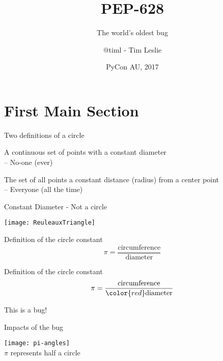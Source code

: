 \documentclass[14pt]{beamer}
\title{PEP-628}
\subtitle{The world's oldest bug}
\author{@timl - Tim Leslie\inst{1}}
\institute[Breakaway Consulting] %
{
  \inst{1}%
  Breakaway Consulting}
\date{PyCon AU, 2017}
\begin{document}
\begin{frame}
  \titlepage
\end{frame}

\section{First Main Section}

\begin{frame}{Two definitions of a circle}
    \begin{definition}
    A continuous set of points with a constant {\color{red}diameter}\\
    -- No-one (ever)
    \end{definition}
    \begin{definition}
    The set of all points a constant distance ({\color{red}radius}) from a center point\\
    -- Everyone (all the time)
    \end{definition}
\end{frame}

\begin{frame}{Constant Diameter - Not a circle}
\begin{center}
    \texttt{[image: ReuleauxTriangle]}
\end{center}
\end{frame}

\begin{frame}{Definition of the circle constant}
\Large
\begin{equation*}
    \pi = \frac{\textrm{circumference}}{\textrm{diameter}}
\end{equation*}
\end{frame}

\begin{frame}{Definition of the circle constant}
\Large
\begin{equation*}
    \pi = \frac{\textrm{circumference}}{\color{red}\textrm{diameter}}
\end{equation*}
\begin{center}
\newline
{\Huge This is a bug!}
\end{center}
\end{frame}

\begin{frame}{Impacts of the bug}
\begin{center}
\texttt{[image: pi-angles]}
\\$\pi$ represents half a circle
\end{center}
\end{frame}
\end{document}
